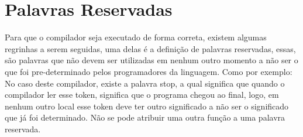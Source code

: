 
\chapter{Palavras Reservadas}
Para que o compilador seja executado de forma correta, existem algumas regrinhas a serem seguidas, uma delas é a definição de palavras reservadas, essas, são palavras que não devem ser utilizadas em nenhum outro momento a não ser o que foi pre-determinado pelos programadores da linguagem.
Como por exemplo: No caso deste compilador, existe a palavra stop, a qual significa que quando o compilador ler esse token, significa que o programa chegou ao final, logo, em nenhum outro local esse token deve ter outro significado a não ser o significado que já foi determinado. Não se pode atribuir uma outra função a uma palavra reservada.
 

\begin{center} \printglossaries
\end{center}